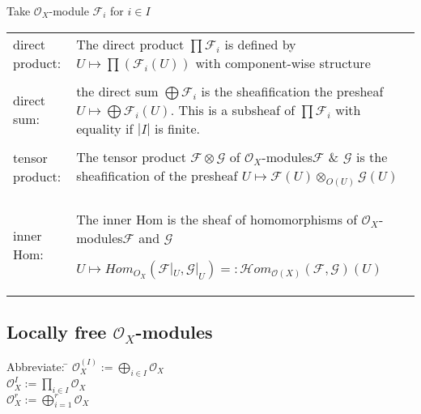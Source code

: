 \documentclass[a4paper, 12pt]{article}
\newcommand{\ca}[1]{\mathcal{#1}}
\newcommand{\caf}{\mathcal{F}}
\newcommand{\cag}{\mathcal{G}}
\newcommand{\oxmod}{$\mathcal{O}_X$-module }
\newcommand{\oxmods}{$\mathcal{O}_X$-modules}
\newcommand{\ox}{\mathcal{O}_X}
\begin{document}
Take \oxmod  $\ca{F}_i$ for $i \in I$
\\
\begin{longtable}{p{}  p{} } 


direct product: & The direct product $\prod \ca{F}_i$ is defined by $U\longmapsto \prod(\ca{F}_i(U))$ with component-wise structure
\\

&\\

direct sum: & the direct sum $\bigoplus \ca{F}_i$ is the sheafification the presheaf $U\longmapsto \bigoplus \ca{F}_i(U)$. This is a subsheaf of $\prod\ca{F}_i$ with equality if $|I|$ is finite.
\\

&\\

tensor product: &The tensor product $\ca{F}\otimes\ca{G}$ of \oxmods $\ca{F}$ \& $\cag$ is the sheafification of the presheaf $U\longmapsto \caf(U)\otimes_{O(U)}\cag(U)$
\\

&\\

inner Hom: & The inner Hom is the sheaf of homomorphisms of \oxmods $\caf$ and $\cag$

$U\longmapsto Hom_{O_X}(\caf|_U , \cag|_U) =: \ca{H}om_{\ca{O}(X)}(\caf , \cag)(U)$
\\

\end{longtable}


\subsection{Locally free \oxmods}

\begin{tabbing}
  Abbreviate:     \= $\ox^{(I)} := \bigoplus_{i \in I} \ox $\\
  \>$  \ox^I := \prod_{i \in I} \ox $\\
  \> $ \ox^r := \bigoplus^{r}_{i=1}\ox$\\
  
  \\
\end{tabbing}
\end{document}
